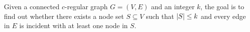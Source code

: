\documentclass[sigconf]{acmart}
\begin{document}
\begin{problem}
Given a connected \(c\)-regular graph \(G=(V,E)\) and an integer \(k\), the goal is to find out whether there exists a node set \(S\subseteq V\) such that \(\left|S \right|\le k\) and every edge in \(E\) is incident with at least one node in \(S\).
\end{problem}

\end{document}
